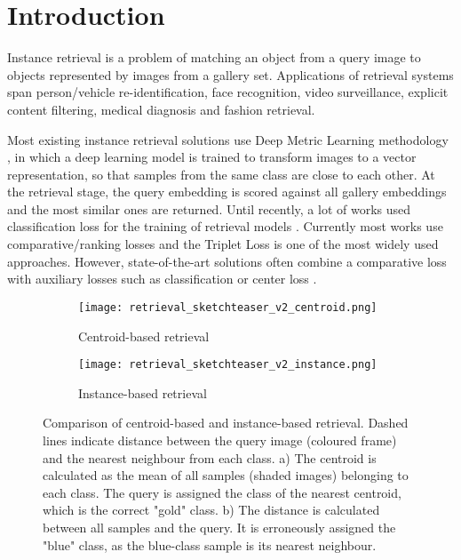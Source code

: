 \documentclass[sigconf,nonacm]{acmart}
\begin{document}
\keywords{}

\maketitle

\section{Introduction}

Instance retrieval is a problem of matching an object from a query image to objects represented by images from a gallery set. Applications of retrieval systems span person/vehicle re-identification,  face recognition, video surveillance, explicit content filtering, medical diagnosis and fashion retrieval.  

Most existing instance retrieval solutions use Deep Metric Learning methodology \cite{Diao2021_similarity_reasoning_dml, Jun_combination_dml, Wieczorek2020, luo_reid_strong_baseline, Liu_deepfashion, Yuan_in_defense_of_the}, in which a deep learning model is trained to transform images to a vector representation, so that samples from the same class are close to each other. At the retrieval stage, the query embedding is scored against all gallery embeddings and the most similar ones are returned.
Until recently, a lot of works used classification loss for the training of retrieval models \cite{Noh2017_class_loss, Xiao2016_class_loss, Zhai2018_class_loss, Zhou2019_class_loss, Xiao2016a_class_loss}.
Currently most works use comparative/ranking losses and the Triplet Loss is one of the most widely used approaches. However, state-of-the-art solutions often combine a comparative loss with auxiliary losses such as classification or center loss \cite{Wieczorek2020, luo_reid_strong_baseline, Wen2016_a_discriminative_feature, Lagunes-Fortiz_centroids_triplet, Yuan_in_defense_of_the}.


\begin{figure}[]
    \begin{subfigure}{0.52\columnwidth}
      \centering
      \texttt{[image: retrieval\_sketchteaser\_v2\_centroid.png]}
      \caption{Centroid-based retrieval}
    \end{subfigure}
    \begin{subfigure}{0.46\columnwidth}
      \centering
      \texttt{[image: retrieval\_sketchteaser\_v2\_instance.png]}
      \caption{Instance-based retrieval}
    \end{subfigure}
    \caption{Comparison of centroid-based and  instance-based retrieval. Dashed lines indicate distance between the query image (coloured frame) and the nearest neighbour from each class. a) The centroid  is calculated as the mean of all samples (shaded images) belonging to each class. The query is assigned the class of the nearest centroid, which is the correct "gold" class. b) The distance is calculated between all samples and the query. It is erroneously assigned the "blue" class, as the blue-class sample is its nearest neighbour.}
    \label{fig:teaser_image}
\end{figure}
\end{document}
